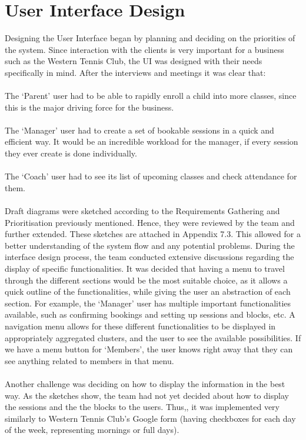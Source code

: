 \documentclass{l3proj}
\begin{document}
\section{User Interface Design}
\par
Designing the User Interface began by planning and deciding on the priorities of the system. Since interaction with the clients is very important for a business such as the Western Tennis Club, the UI was designed with their needs specifically in mind. After the interviews and meetings it was clear that:\\
\\The `Parent' user had to be able to rapidly enroll a child into more classes, since this is the major driving force for the business.\\
\\The `Manager' user had to create a set of bookable sessions in a quick and efficient way. It would be an incredible workload for the manager, if every session they ever create is done individually.\\
\\The `Coach' user had to see its list of upcoming classes and check attendance for them.\\
\\Draft diagrams were sketched according to the Requirements Gathering and Prioritisation previously mentioned. Hence, they were reviewed by the team and further extended. These sketches are attached in Appendix 7.3. This allowed for a better understanding of the system flow and any potential problems. During the interface design process, the team conducted extensive discussions regarding the display of specific functionalities.  It was decided that having a menu to travel through the different sections would be the most suitable choice, as it allows a quick outline of the functionalities, while giving the user an abstraction of each section. For example, the `Manager' user has multiple important functionalities available, such as confirming bookings and setting up sessions and blocks, etc. A navigation menu allows for these different functionalities to be displayed in appropriately aggregated clusters, and the user to see the available possibilities. If we have a menu button for `Members', the user knows right away that they can see anything related to members in that menu.\\
\\Another challenge was deciding on how to display the information in the best way. As the sketches show, the team had not yet decided about how to display the sessions and the the blocks to the users. Thus,, it was implemented very similarly to Western Tennis Club’s Google form (having checkboxes for each day of the week, representing mornings or full days). \\
\end{document}
